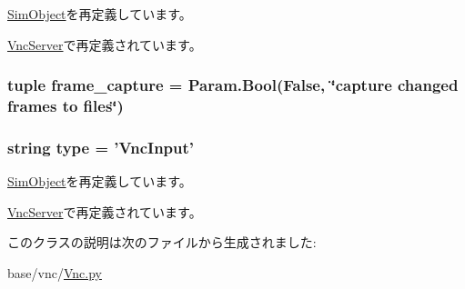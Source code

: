 \hyperlink{classm5_1_1SimObject_1_1SimObject_a17da7064bc5c518791f0c891eff05fda}{SimObject}を再定義しています。

\hyperlink{classVnc_1_1VncServer_a17da7064bc5c518791f0c891eff05fda}{VncServer}で再定義されています。\hypertarget{classVnc_1_1VncInput_a4c10beaa6887df59fa47981a61d1b8c3}{
\subsubsection[{frame\_\-capture}]{\setlength{\rightskip}{0pt plus 5cm}tuple {\bf frame\_\-capture} = Param.Bool(False, \char`\"{}capture changed frames to files\char`\"{})}}
\label{classVnc_1_1VncInput_a4c10beaa6887df59fa47981a61d1b8c3}
\hypertarget{classVnc_1_1VncInput_acce15679d830831b0bbe8ebc2a60b2ca}{
\subsubsection[{type}]{\setlength{\rightskip}{0pt plus 5cm}string {\bf type} = '{\bf VncInput}'}}
\label{classVnc_1_1VncInput_acce15679d830831b0bbe8ebc2a60b2ca}


\hyperlink{classm5_1_1SimObject_1_1SimObject_acce15679d830831b0bbe8ebc2a60b2ca}{SimObject}を再定義しています。

\hyperlink{classVnc_1_1VncServer_acce15679d830831b0bbe8ebc2a60b2ca}{VncServer}で再定義されています。

このクラスの説明は次のファイルから生成されました:\begin{DoxyCompactItemize}
\item 
base/vnc/\hyperlink{Vnc_8py}{Vnc.py}\end{DoxyCompactItemize}
